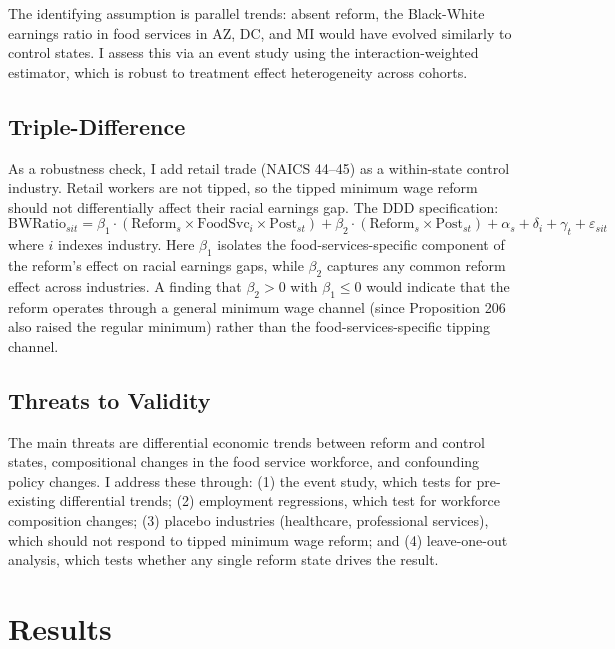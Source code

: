 \documentclass[12pt]{article}
\begin{document}
The identifying assumption is parallel trends: absent reform, the Black-White earnings ratio in food services in AZ, DC, and MI would have evolved similarly to control states. I assess this via an event study using the \citet{sun2021estimating} interaction-weighted estimator, which is robust to treatment effect heterogeneity across cohorts.

\subsection{Triple-Difference}

As a robustness check, I add retail trade (NAICS 44--45) as a within-state control industry. Retail workers are not tipped, so the tipped minimum wage reform should not differentially affect their racial earnings gap. The DDD specification:
\begin{equation}
\text{BWRatio}_{sit} = \beta_1 \cdot (\text{Reform}_s \times \text{FoodSvc}_i \times \text{Post}_{st}) + \beta_2 \cdot (\text{Reform}_s \times \text{Post}_{st}) + \alpha_s + \delta_i + \gamma_t + \varepsilon_{sit}
\label{eq:ddd}
\end{equation}
where $i$ indexes industry. Here $\beta_1$ isolates the food-services-specific component of the reform's effect on racial earnings gaps, while $\beta_2$ captures any common reform effect across industries. A finding that $\beta_2 > 0$ with $\beta_1 \leq 0$ would indicate that the reform operates through a general minimum wage channel (since Proposition 206 also raised the regular minimum) rather than the food-services-specific tipping channel.

\subsection{Threats to Validity}

The main threats are differential economic trends between reform and control states, compositional changes in the food service workforce, and confounding policy changes. I address these through: (1) the event study, which tests for pre-existing differential trends; (2) employment regressions, which test for workforce composition changes; (3) placebo industries (healthcare, professional services), which should not respond to tipped minimum wage reform; and (4) leave-one-out analysis, which tests whether any single reform state drives the result.

\section{Results}
\end{document}
